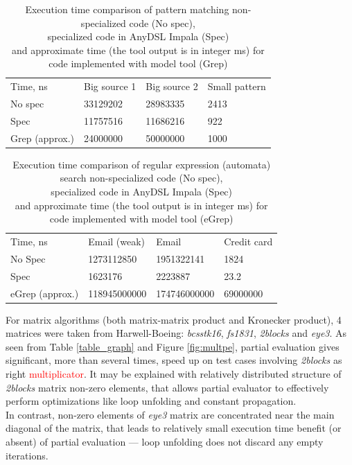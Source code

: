 \documentclass[conference]{IEEEtran}
\begin{document}
\begin{table}[]
	\begin{tabular}{llll}
		Time, ns       & Big source 1 & Big source 2 & Small pattern \\
		No spec        & 33129202     & 28983335     & 2413          \\
		Spec           & 11757516     & 11686216     & 922           \\
		Grep (approx.) & 24000000     & 50000000     & 1000                   
	\end{tabular}
	\centering
	\caption{Execution time comparison of pattern matching non-specialized code (No spec),\\ specialized code in AnyDSL Impala (Spec) \\ and approximate time (the tool output is in integer ms) for code implemented with model tool (Grep)}
	\label{table_string}
\end{table}

\begin{table}[]
	\begin{tabular}{llll}
		Time, ns        & Email (weak) & Email        & Credit card \\
		No Spec         & 1273112850   & 1951322141   & 1824        \\
		Spec            & 1623176      & 2223887      & 23.2        \\
		eGrep (approx.) & 118945000000 & 174746000000 & 69000000          
	\end{tabular}
	\centering
	\caption{Execution time comparison of regular expression (automata) search non-specialized code (No spec),\\ specialized code in AnyDSL Impala (Spec) \\ and approximate time (the tool output is in integer ms) for code implemented with model tool (eGrep)}
	\label{table_regex}
\end{table}

For matrix algorithms (both matrix-matrix product and Kronecker product), 4 matrices were taken from Harwell-Boeing: \textit{bcsstk16}, \textit{fs1831}, \textit{2blocks} and \textit{eye3}. As seen from Table \ref{table_graph} and Figure \ref{fig:multpe}, partial evaluation gives significant, more than several times, speed up on test cases involving \textit{2blocks} as right \textcolor{red}{multiplicator}. It may be explained with relatively distributed structure of \textit{2blocks} matrix non-zero elements, that allows partial evaluator to effectively perform optimizations like loop unfolding and constant propagation.\\
In contrast, non-zero elements of \textit{eye3} matrix are concentrated near the main diagonal of the matrix, that leads to relatively small execution time benefit (or absent) of partial evaluation --- loop unfolding does not discard any empty iterations.
\end{document}
